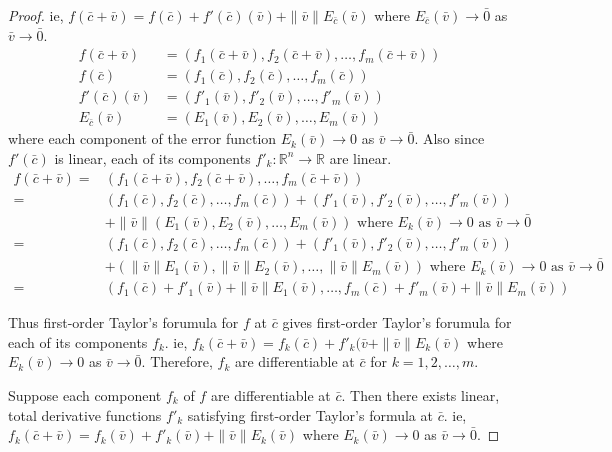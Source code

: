 \begin{proof}
ie, $f(\bar{c}+\bar{v}) = f(\bar{c}) + f'(\bar{c})(\bar{v}) + \|\bar{v}\| E_{\bar{c}}(\bar{v})$ where $E_{\bar{c}}(\bar{v}) \to \bar{0}$ as $\bar{v} \to \bar{0}$.
\begin{align*}
	f(\bar{c}+\bar{v}) & = \left( f_1(\bar{c}+\bar{v}), f_2(\bar{c}+\bar{v}), \dots, f_m(\bar{c}+\bar{v}) \right)\\
	f(\bar{c}) & = \left( f_1(\bar{c}), f_2(\bar{c}), \dots, f_m(\bar{c}) \right) \\
	f'(\bar{c})(\bar{v}) & = \left( f'_1(\bar{v}), f'_2(\bar{v}), \dots, f'_m(\bar{v}) \right) \\
	E_{\bar{c}}(\bar{v}) & = \left( E_1(\bar{v}), E_2(\bar{v}), \dots, E_m(\bar{v}) \right)
\end{align*}
where each component of the error function $E_k(\bar{v}) \to 0$ as $\bar{v} \to \bar{0}$.
Also since $f'(\bar{c})$ is linear, each of its components $f'_k : \mathbb{R}^n \to \mathbb{R}$ are linear.
\begin{align*}
	f(\bar{c}+\bar{v}) = & \left( f_1(\bar{c}+\bar{v}), f_2(\bar{c}+\bar{v}), \dots, f_m(\bar{c}+\bar{v}) \right) \\
	= & \left( f_1(\bar{c}), f_2(\bar{c}), \dots, f_m(\bar{c}) \right) + \left( f'_1(\bar{v}), f'_2(\bar{v}), \dots, f'_m(\bar{v}) \right) \\
	& + \|\bar{v}\|\left(E_1(\bar{v}), E_2(\bar{v}), \dots, E_m(\bar{v}) \right) \text{ where } E_k(\bar{v}) \to 0 \text{ as } \bar{v} \to \bar{0}\\
	= & \left( f_1(\bar{c}), f_2(\bar{c}), \dots, f_m(\bar{c}) \right) + \left( f'_1(\bar{v}), f'_2(\bar{v}), \dots, f'_m(\bar{v}) \right) \\
	& + \left(\|\bar{v}\|E_1(\bar{v}), \|\bar{v}\|E_2(\bar{v}), \dots, \|\bar{v}\|E_m(\bar{v}) \right) \text{ where } E_k(\bar{v}) \to 0 \text{ as } \bar{v} \to \bar{0}\\
	= & \left( f_1(\bar{c}) + f'_1(\bar{v}) + \|\bar{v}\|E_1(\bar{v}), \dots, f_m(\bar{c}) + f'_m(\bar{v}) + \|\bar{v}\|E_m(\bar{v}) \right) 
\end{align*}

Thus first-order Taylor's forumula for $f$ at $\bar{c}$ gives first-order Taylor's forumula for each of its components $f_k$.
ie, $f_k(\bar{c}+\bar{v}) = f_k(\bar{c}) + f'_k(\bar{v} + \|\bar{v}\|E_k(\bar{v})$ where $E_k(\bar{v}) \to 0$ as $\bar{v} \to \bar{0}$.
Therefore, $f_k$ are differentiable at $\bar{c}$ for $k = 1,2,\dots, m$.

Suppose each component $f_k$ of $f$ are differentiable at $\bar{c}$.
Then there exists linear, total derivative functions $f'_k$ satisfying first-order Taylor's formula at $\bar{c}$.
ie, $f_k(\bar{c}+\bar{v}) = f_k(\bar{v}) + f'_k(\bar{v}) + \|\bar{v}\|E_k(\bar{v})$ where $E_k(\bar{v}) \to 0$ as $\bar{v} \to \bar{0}$.


\end{proof}
